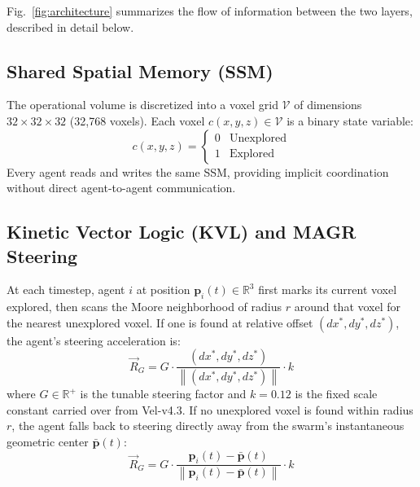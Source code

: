 \documentclass[10pt,journal]{IEEEtran}
\newcommand{\norm}[1]{\left\lVert#1\right\rVert}
\begin{document}
Fig.~\ref{fig:architecture} summarizes the flow of information between the
two layers, described in detail below.

\subsection{Shared Spatial Memory (SSM)}
The operational volume is discretized into a voxel grid $\mathcal{V}$ of
dimensions $32\times32\times32$ (32{,}768 voxels). Each voxel
$c(x,y,z)\in\mathcal{V}$ is a binary state variable:
\begin{equation}
c(x,y,z) = \begin{cases} 0 & \text{Unexplored} \\ 1 & \text{Explored} \end{cases}
\end{equation}
Every agent reads and writes the same SSM, providing implicit coordination
without direct agent-to-agent communication.

\subsection{Kinetic Vector Logic (KVL) and MAGR Steering}
At each timestep, agent $i$ at position $\mathbf{p}_i(t)\in\mathbb{R}^3$
first marks its current voxel explored, then scans the Moore neighborhood
of radius $r$ around that voxel for the nearest unexplored voxel. If one is
found at relative offset $(dx^*,dy^*,dz^*)$, the agent's steering
acceleration is:
\begin{equation}
\vec{R}_G = G \cdot \frac{(dx^*,dy^*,dz^*)}{\norm{(dx^*,dy^*,dz^*)}} \cdot k
\label{eq:magr_found}
\end{equation}
where $G\in\mathbb{R}^+$ is the tunable steering factor and $k=0.12$ is the
fixed scale constant carried over from Vel-v4.3. If no unexplored voxel is
found within radius $r$, the agent falls back to steering directly away
from the swarm's instantaneous geometric center $\bar{\mathbf{p}}(t)$:
\begin{equation}
\vec{R}_G = G \cdot \frac{\mathbf{p}_i(t) - \bar{\mathbf{p}}(t)}{\norm{\mathbf{p}_i(t) - \bar{\mathbf{p}}(t)}} \cdot k
\label{eq:magr_fallback}
\end{equation}
\end{document}
